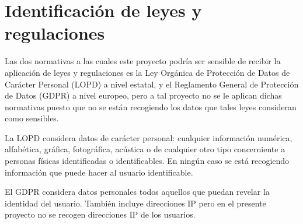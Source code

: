\chapter{Identificación de leyes y regulaciones}

Las dos normativas a las cuales este proyecto podría ser sensible de recibir la aplicación de leyes y regulaciones es la Ley Orgánica de Protección de Datos de Carácter Personal (LOPD) a nivel estatal, y el Reglamento General de Protección de Datos (GDPR) a nivel europeo, pero a tal proyecto no se le aplican dichas normativas puesto que no se están recogiendo los datos que tales leyes consideran como sensibles.

La LOPD considera datos de carácter personal: cualquier información numérica, alfabética, gráfica, fotográfica, acústica o de cualquier otro tipo concerniente a personas físicas identificadas o identificables.
En ningún caso se está recogiendo información que puede hacer al usuario identificable.

El GDPR considera datos personales todos aquellos que puedan revelar la identidad del usuario. También incluye direcciones IP pero en el presente proyecto no se recogen direcciones IP de los usuarios.